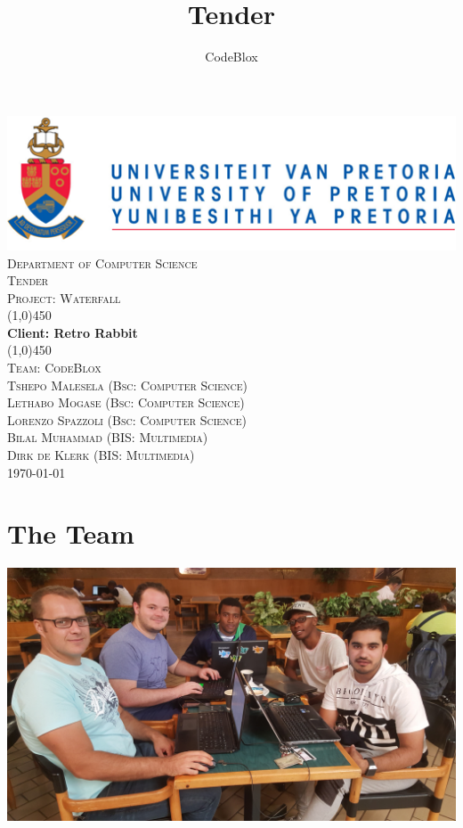 \documentclass[a4paper,12pt]{article}
\author{CodeBlox}
\title{Tender}
\begin{document}
	\setlength{\parskip}{6pt}
	
	\begin{titlepage}
		\begin{center}
			\includegraphics[width=1\textwidth]{./Pictures/up_logo.png}\\[1.5cm] 
			\textsc{\LARGE Department of Computer Science} \\ [.5cm]
			\textsc{\Large Tender} \\ [.5cm]
			\textsc{\Large Project: Waterfall} \\ [.5cm]
			\line(1,0){450}\\[.5cm]
			\huge{\bfseries Client: Retro Rabbit}\\
			\line(1,0){450}\\[.5cm]
			\textsc{\LARGE Team: CodeBlox}\\ [0.5cm]
			
			
			\textsc{\large Tshepo Malesela (Bsc: Computer Science)}\\
			\textsc{\large Lethabo Mogase (Bsc: Computer Science)}\\
			\textsc{\large Lorenzo Spazzoli (Bsc: Computer Science)}\\
			\textsc{\large Bilal Muhammad (BIS: Multimedia)}\\
			\textsc{\large Dirk de Klerk (BIS: Multimedia)}\\ [3.9cm]
			
			\large\today
		\end{center}
	\end{titlepage}
	
	\tableofcontents
	\thispagestyle{empty}
	\footnotesize
	\normalsize
	
	
	
	
	\newpage
	\section{The Team}
	
	\includegraphics[width=1\textwidth]{./Pictures/the_group.jpg}\\
	
\end{document}
